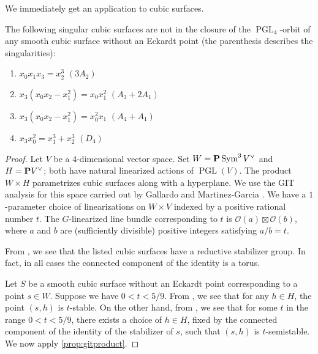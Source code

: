 \documentclass[reqno]{amsart}
\renewcommand {\P}{{\bf P}}
\providecommand{\PGL}{\operatorname{PGL}}
\providecommand{\Sym}{\operatorname{Sym}}
\numberwithin{equation}{section}
\renewcommand{\O}{\mathcal{O}}
\begin{document}
We immediately get an application to cubic surfaces.
\begin{proposition}\label{prop:isogood}
  The following singular cubic surfaces are not in the closure of the $\PGL_4$-orbit of any smooth cubic surface without an Eckardt point (the parenthesis describes the singularities):
  \begin{enumerate}
  \item $x_0x_1x_3 = x_2^3$ \quad $(3A_2)$
  \item $x_3(x_0x_2-x_1^2) = x_0x_1^2$ \quad $(A_3 + 2A_1)$
  \item $x_3(x_0x_2-x_1^2) = x_0^2x_1$ \quad $(A_4 + A_1)$
  \item $x_3x_0^2 = x_1^3 + x_2^3$ \quad $(D_4)$
  \end{enumerate}
\end{proposition}
\begin{proof}
  Let $V$ be a 4-dimensional vector space.
  Set $W = \P \Sym^3 V^{\vee}$ and $H = \P V^{\vee}$; both have natural linearized actions of $\PGL(V)$.
  The product $W \times H$ parametrizes cubic surfaces along with a hyperplane.
  We use the GIT analysis for this space carried out by Gallardo and Martinez-Garcia \cite{gal.mar:19}.
  We have a $1$-parameter choice of linearizations on $W \times V$ indexed by a positive rational number $t$.
  The $G$-linearized line bundle corresponding to $t$ is $\O(a) \boxtimes \O(b)$, where $a$ and $b$ are (sufficiently divisible) positive integers satisfying $a/b = t$.

  From \cite[Theorem~3]{sak:10}, we see that the listed cubic surfaces have a reductive stabilizer group.
  In fact, in all cases the connected component of the identity is a torus.

  Let $S$ be a smooth cubic surface without an Eckardt point corresponding to a point $s \in W$.
  Suppose we have $0 < t < 5/9$.
  From \cite[Theorem~2]{gal.mar:19}, we see  that for any $h \in H$, the point $(s,h)$ is $t$-stable.
  On the other hand, from \cite[Table 2]{gal.mar:19}, we see that for some $t$ in the range $0 < t < 5/9$, there exists a choice of $h \in H$, fixed by the connected component of the identity of the stabilizer of $s$, such that $(s,h)$ is $t$-semistable.
  We now apply \autoref{prop:gitproduct}.


\end{proof}
\end{document}
